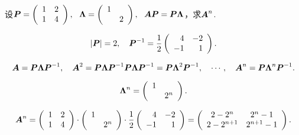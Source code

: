 \begin{frame}
\begin{li}
  设$\boldsymbol{P} = \left(
    \begin{array}{cc}
      1 & 2\\
      1 & 4
    \end{array}
  \right), ~~ \boldsymbol{\Lambda}=\left(
    \begin{array}{cc}
      1 & \\
        & 2
    \end{array}
  \right), ~~ \boldsymbol{A}\boldsymbol{P}=\boldsymbol{P}\boldsymbol{\Lambda}$，求$\boldsymbol{A}^n$.
\end{li} \pause 
\begin{jie}
$$
|\boldsymbol{P}|=2, \quad \boldsymbol{P}^{-1} = \frac12 \left(
  \begin{array}{rr}
    4 & -2\\
    -1 & 1
  \end{array}
\right).
$$ \pause 

$$
\boldsymbol{A} = \boldsymbol{P}\boldsymbol{\Lambda}\boldsymbol{P}^{-1}, \quad 
\boldsymbol{A}^2 = \boldsymbol{P}\boldsymbol{\Lambda}\boldsymbol{P}^{-1}\boldsymbol{P}\boldsymbol{\Lambda}\boldsymbol{P}^{-1} = \boldsymbol{P}\boldsymbol{\Lambda}^2\boldsymbol{P}^{-1}, \quad 
\cdots, \quad 
\boldsymbol{A}^n = \boldsymbol{P}\boldsymbol{\Lambda}^n\boldsymbol{P}^{-1}.
$$ \pause 

$$
\boldsymbol{\Lambda}^n = \left(
  \begin{array}{cc}
    1 & \\
      & 2^n
  \end{array}
\right).
$$

$$
\boldsymbol{A}^n =  \left(
  \begin{array}{cc}
    1 & 2\\
    1 & 4
  \end{array}
\right) \cdot \left(
  \begin{array}{cc}
    1 & \\
      & 2^n
  \end{array}
\right) \cdot \frac12 \left(
  \begin{array}{rr}
    4 & -2\\
    -1 & 1
  \end{array}
\right) = \left(
  \begin{array}{cc}
    2-2^n & 2^n-1\\
    2-2^{n+1} & 2^{n+1}-1
  \end{array}
\right).
$$

\end{jie}
\end{frame}

